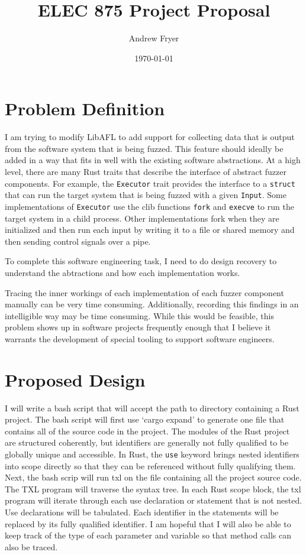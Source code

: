 \documentclass[11pt]{article}
\title{ELEC 875 Project Proposal}
\author{Andrew Fryer}
\date{\today}
\begin{document}
\maketitle

\section{Problem Definition}

I am trying to modify LibAFL to add support for collecting data that is output from the software system that is being fuzzed.
This feature should ideally be added in a way that fits in well with the existing software abstractions.
At a high level, there are many Rust traits that describe the interface of abstract fuzzer components.
For example, the \lstinline{Executor} trait provides the interface to a \lstinline{struct} that can run the target system that is being fuzzed with a given \lstinline{Input}.
Some implementations of \lstinline{Executor} use the clib functions \lstinline{fork} and \lstinline{execve} to run the target system in a child process.
Other implementations fork when they are initialized and then run each input by writing it to a file or shared memory and then sending control signals over a pipe.

To complete this software engineering task, I need to do design recovery to understand the abtractions and how each implementation works.

Tracing the inner workings of each implementation of each fuzzer component manually can be very time consuming.
Additionally, recording this findings in an intelligible way may be time consuming.
While this would be feasible, this problem shows up in software projects frequently enough that I believe it warrants the development of special tooling to support software engineers.

\section{Proposed Design}

I will write a bash script that will accept the path to directory containing a Rust project.
The bash script will first use `cargo expand' to generate one file that contains all of the source code in the project.
The modules of the Rust project are structured coherently, but identifiers are generally not fully qualified to be globally unique and accessible.
In Rust, the \lstinline{use} keyword brings nested identifiers into scope directly so that they can be referenced without fully qualifying them.
Next, the bash scrip will run txl on the file containing all the project source code.
The TXL program will traverse the syntax tree.
In each Rust scope block, the txl program will iterate through each use declaration or statement that is not nested.
Use declarations will be tabulated.
Each identifier in the statements will be replaced by its fully qualified identifier.
I am hopeful that I will also be able to keep track of the type of each parameter and variable so that method calls can also be traced.
\end{document}
